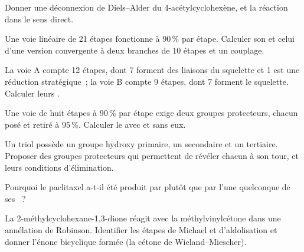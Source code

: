 \begin{exercise}[$\star$]\label{exo:b3:total-synthesis:4}
Donner une déconnexion de Diels--Alder du 4-acétylcyclohexène, et la
réaction dans le sens direct.
\end{exercise}

\begin{exercise}[$\star\star$]\label{exo:b3:total-synthesis:5}
Une voie linéaire de 21 étapes fonctionne à 90\,\% par étape. Calculer son
 et celui d'une version convergente à deux branches de 10
étapes et un couplage.
\end{exercise}

\begin{exercise}[$\star\star$]\label{exo:b3:total-synthesis:6}
La voie A compte 12 étapes, dont 7 forment des liaisons du squelette et 1
est une réduction stratégique~; la voie B compte 9 étapes, dont 7 forment
le squelette. Calculer leurs .
\end{exercise}

\begin{exercise}[$\star\star$]\label{exo:b3:total-synthesis:7}
Une voie de huit étapes à 90\,\% par étape exige deux groupes protecteurs,
chacun posé et retiré à 95\,\%. Calculer le  avec et sans
eux.
\end{exercise}

\begin{exercise}[$\star\star$]\label{exo:b3:total-synthesis:8}
Un triol possède un groupe hydroxy primaire, un secondaire et un tertiaire.
Proposer des groupes protecteurs qui permettent de révéler chacun à son
tour, et leurs conditions d'élimination.
\end{exercise}

\begin{exercise}[$\star\star$]\label{exo:b3:total-synthesis:9}
Pourquoi le paclitaxel a-t-il été produit par  plutôt que par
l'une quelconque de ses ~?
\end{exercise}

\begin{exercise}[$\star\star\star$]\label{exo:b3:total-synthesis:10}
La 2-méthylcyclohexane-1,3-dione réagit avec la méthylvinylcétone dans une
annélation de Robinson. Identifier les étapes de Michael et d'aldolisation
et donner l'énone bicyclique formée (la cétone de Wieland--Miescher).
\end{exercise}

